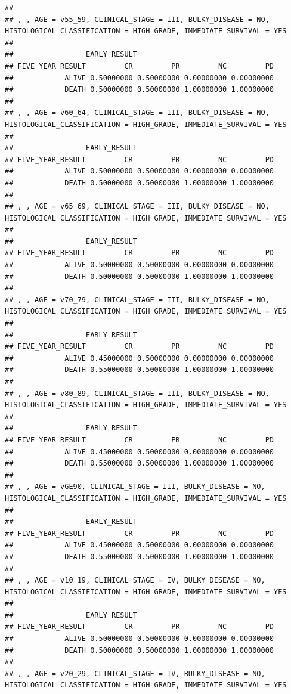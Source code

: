 \documentclass[]{article}
\begin{document}
\begin{verbatim}
## 
## , , AGE = v55_59, CLINICAL_STAGE = III, BULKY_DISEASE = NO, HISTOLOGICAL_CLASSIFICATION = HIGH_GRADE, IMMEDIATE_SURVIVAL = YES
## 
##                 EARLY_RESULT
## FIVE_YEAR_RESULT         CR         PR         NC         PD
##            ALIVE 0.50000000 0.50000000 0.00000000 0.00000000
##            DEATH 0.50000000 0.50000000 1.00000000 1.00000000
## 
## , , AGE = v60_64, CLINICAL_STAGE = III, BULKY_DISEASE = NO, HISTOLOGICAL_CLASSIFICATION = HIGH_GRADE, IMMEDIATE_SURVIVAL = YES
## 
##                 EARLY_RESULT
## FIVE_YEAR_RESULT         CR         PR         NC         PD
##            ALIVE 0.50000000 0.50000000 0.00000000 0.00000000
##            DEATH 0.50000000 0.50000000 1.00000000 1.00000000
## 
## , , AGE = v65_69, CLINICAL_STAGE = III, BULKY_DISEASE = NO, HISTOLOGICAL_CLASSIFICATION = HIGH_GRADE, IMMEDIATE_SURVIVAL = YES
## 
##                 EARLY_RESULT
## FIVE_YEAR_RESULT         CR         PR         NC         PD
##            ALIVE 0.50000000 0.50000000 0.00000000 0.00000000
##            DEATH 0.50000000 0.50000000 1.00000000 1.00000000
## 
## , , AGE = v70_79, CLINICAL_STAGE = III, BULKY_DISEASE = NO, HISTOLOGICAL_CLASSIFICATION = HIGH_GRADE, IMMEDIATE_SURVIVAL = YES
## 
##                 EARLY_RESULT
## FIVE_YEAR_RESULT         CR         PR         NC         PD
##            ALIVE 0.45000000 0.50000000 0.00000000 0.00000000
##            DEATH 0.55000000 0.50000000 1.00000000 1.00000000
## 
## , , AGE = v80_89, CLINICAL_STAGE = III, BULKY_DISEASE = NO, HISTOLOGICAL_CLASSIFICATION = HIGH_GRADE, IMMEDIATE_SURVIVAL = YES
## 
##                 EARLY_RESULT
## FIVE_YEAR_RESULT         CR         PR         NC         PD
##            ALIVE 0.45000000 0.50000000 0.00000000 0.00000000
##            DEATH 0.55000000 0.50000000 1.00000000 1.00000000
## 
## , , AGE = vGE90, CLINICAL_STAGE = III, BULKY_DISEASE = NO, HISTOLOGICAL_CLASSIFICATION = HIGH_GRADE, IMMEDIATE_SURVIVAL = YES
## 
##                 EARLY_RESULT
## FIVE_YEAR_RESULT         CR         PR         NC         PD
##            ALIVE 0.45000000 0.50000000 0.00000000 0.00000000
##            DEATH 0.55000000 0.50000000 1.00000000 1.00000000
## 
## , , AGE = v10_19, CLINICAL_STAGE = IV, BULKY_DISEASE = NO, HISTOLOGICAL_CLASSIFICATION = HIGH_GRADE, IMMEDIATE_SURVIVAL = YES
## 
##                 EARLY_RESULT
## FIVE_YEAR_RESULT         CR         PR         NC         PD
##            ALIVE 0.50000000 0.50000000 0.00000000 0.00000000
##            DEATH 0.50000000 0.50000000 1.00000000 1.00000000
## 
## , , AGE = v20_29, CLINICAL_STAGE = IV, BULKY_DISEASE = NO, HISTOLOGICAL_CLASSIFICATION = HIGH_GRADE, IMMEDIATE_SURVIVAL = YES

\end{verbatim}
\end{document}
